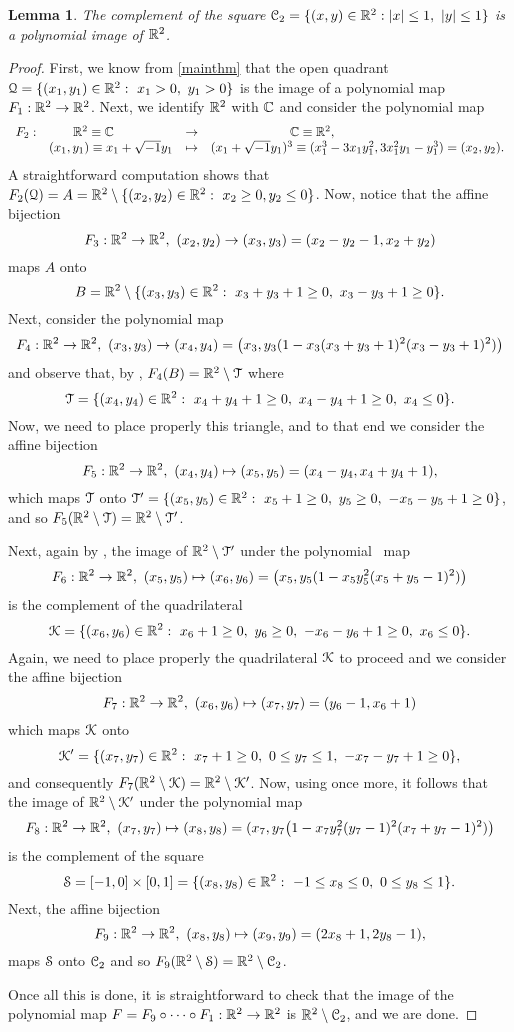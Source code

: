 \documentclass[11pt,a4paper]{amsart}
\newtheorem{lem}[theor]{Lemma}
\theoremstyle{definition}
\theoremstyle{remark}
\newcommand{\pol}{{\EuScript K}}
\newcommand{\trian}{{\EuScript T}}
\newcommand{\Qq}{{\EuScript Q}}
\newcommand{\cube}{{\EuScript C}}
\newcommand{\squarea}{{\EuScript S}}
\begin{document}
\begin{lem}\label{n2}
The complement of the square $\cube_2=\{(x,y)\in\R^2: |x|\le1,\ |y|\le1\}$ is a polynomial image of ${\mathbb R}^2$.
\end{lem}
\begin{proof}
First, we know from \ref{mainthm} that the open quadrant $\Qq=\{(x_1,y_1)\in\R^2:\ x_1>0,\ y_1>0\}$ is the image of a polynomial map $F_1:{\mathbb R}^2\to{\mathbb R}^2$. Next, we identify ${\mathbb R}^2$ with ${\mathbb C}$ and consider the polynomial map 
$$
\begin{array}{cccl}
F_2:&\R^2\equiv\C\hspace{9.75mm}&\to&\hspace{22.1mm}\C\equiv\R^2,\\ 
&(x_1,y_1)\equiv x_1+\sqrt{-1}y_1&\mapsto&(x_1+\sqrt{-1}y_1)^3\equiv(x_1^3-3x_1y_1^2,3x_1^2y_1-y_1^3)=(x_2,y_2).
\end{array}
$$
A straightforward computation shows that $F_2(\Qq)=A=\R^2\setminus\{(x_2,y_2)\in\R^2:\ x_2\geq0, y_2\leq0\}$. Now, notice that the affine bijection
$$
F_3:\R^2\to\R^2,\ (x_2,y_2)\to(x_3,y_3)=(x_2-y_2-1,x_2+y_2)
$$
maps $A$ onto 
$$
B=\R^2\setminus\{(x_3,y_3)\in\R^2:\ x_3+y_3+1\geq0,\ x_3-y_3+1\geq0\}.
$$ Next, consider the polynomial map 
$$
F_4:\R^2\to\R^2,\ (x_3,y_3)\to(x_4,y_4)=\big(x_3,y_3(1-x_3(x_3+y_3+1)^2(x_3-y_3+1)^2)\big)
$$
and observe that, by \cite[2.5]{u2}, $F_4(B)=\R^2\setminus\trian$ where 
$$
\trian=\{(x_4,y_4)\in\R^2:\ x_4+y_4+1\geq0,\ x_4-y_4+1\geq0,\ x_4\leq0\}.
$$ 
Now, we need to place properly this triangle, and to that end we consider the affine bijection
$$
F_5:\R^2\to\R^2,\ (x_4,y_4)\mapsto(x_5,y_5)=(x_4-y_4,x_4+y_4+1),
$$
which maps $\trian$ onto $\trian'=\{(x_5,y_5)\in\R^2:\ x_5+1\geq0,\ y_5\geq0,\ -x_5-y_5+1\geq0\}$, and so $F_5(\R^2\setminus\trian)=\R^2\setminus\trian'$. 

Next, again by \cite[2.5]{u2}, the image of $\R^2\setminus\trian'$ under the polynomial ~map
$$
F_6:\R^2\to\R^2,\ (x_5,y_5)\mapsto(x_6,y_6)=\big(x_5,y_5(1-x_5y_5^2(x_5+y_5-1)^2)\big)
$$
is the complement of the quadrilateral 
$$
\pol=\{(x_6,y_6)\in\R^2:\ x_6+1\geq0,\ y_6\geq0,\ -x_6-y_6+1\geq0,\ x_6\leq0\}.
$$
Again, we need to place properly the quadrilateral $\pol$ to proceed and we consider the affine bijection
$$
F_7:\R^2\to\R^2,\ (x_6,y_6)\mapsto(x_7,y_7)=(y_6-1,x_6+1)
$$
which maps $\pol$ onto 
$$
\pol'=\{(x_7,y_7)\in\R^2:\ x_7+1\geq0,\ 0\leq y_7\leq1,\ -x_7-y_7+1\geq0\},
$$ 
and consequently $F_7(\R^2\setminus \pol)=\R^2\setminus\pol'$. Now, using \cite[2.5]{u2} once more, it follows that the image of $\R^2\setminus \pol'$ under the polynomial map
$$
F_8:\R^2\to\R^2,\ (x_7,y_7)\mapsto(x_8,y_8)=(x_7,y_7\big(1-x_7y_7^2(y_7-1)^2(x_7+y_7-1)^2)\big)
$$
is the complement of the square 
$$
\squarea=[-1,0]\times[0,1]=\{(x_8,y_8)\in\R^2:\ -1\leq x_8\leq0,\ 0\leq y_8\leq1\}.
$$ 
Next, the affine bijection
$$
F_9:\R^2\to\R^2,\ (x_8,y_8)\mapsto(x_9,y_9)=(2x_8+1,2y_8-1),
$$
maps $\squarea$ onto $\cube_2$ and so $F_9(\R^2\setminus\squarea)=\R^2\setminus\cube_2$.

Once all this is done, it is straightforward to check that the image of the polynomial map $F=F_9\circ\cdots\circ F_1:{\mathbb R}^2\to{\mathbb R}^2$ is $\R^2\setminus\cube_2$, and we are done.
\end{proof}
\end{document}
